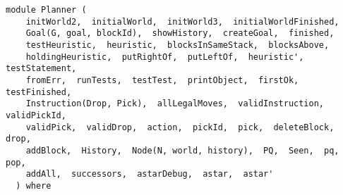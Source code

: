 \label{module:Planner}
\haddockbeginheader
{\haddockverb\begin{verbatim}
module Planner (
    initWorld2,  initialWorld,  initWorld3,  initialWorldFinished, 
    Goal(G, goal, blockId),  showHistory,  createGoal,  finished, 
    testHeuristic,  heuristic,  blocksInSameStack,  blocksAbove, 
    holdingHeuristic,  putRightOf,  putLeftOf,  heuristic',  testStatement, 
    fromErr,  runTests,  testTest,  printObject,  firstOk,  testFinished, 
    Instruction(Drop, Pick),  allLegalMoves,  validInstruction,  validPickId, 
    validPick,  validDrop,  action,  pickId,  pick,  deleteBlock,  drop, 
    addBlock,  History,  Node(N, world, history),  PQ,  Seen,  pq,  pop, 
    addAll,  successors,  astarDebug,  astar,  astar'
  ) where\end{verbatim}}
\haddockendheader

